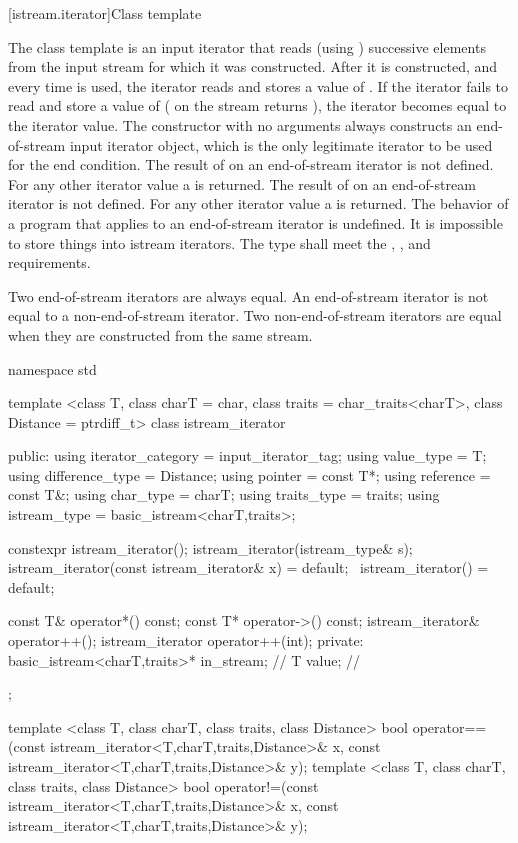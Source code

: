[istream.iterator]{Class template }

\pnum
{}%
The class template
is an input iterator that
reads (using
)
successive elements from the input stream for which it was constructed.
After it is constructed, and every time
\tcode{++}
is used, the iterator reads and stores a value of
.
If the iterator fails to read and store a value of 
(
on the stream returns
),
the iterator becomes equal to the
iterator value.
The constructor with no arguments
always constructs
an end-of-stream input iterator object, which is the only legitimate iterator to be used
for the end condition.
The result of
on an end-of-stream iterator is not defined.
For any other iterator value a
is returned.
The result of
on an end-of-stream iterator is not defined.
For any other iterator value a
is returned.
The behavior of a program that applies  to an end-of-stream
iterator is undefined.
It is impossible to store things into istream iterators.
The type  shall meet the ,
, and  requirements.

\pnum
Two end-of-stream iterators are always equal.
An end-of-stream iterator is not
equal to a non-end-of-stream iterator.
Two non-end-of-stream iterators are equal when they are constructed from the same stream.

\begin{codeblock}
namespace std {
  template <class T, class charT = char, class traits = char_traits<charT>,
      class Distance = ptrdiff_t>
  class istream_iterator {
  public:
    using iterator_category = input_iterator_tag;
    using value_type        = T;
    using difference_type   = Distance;
    using pointer           = const T*;
    using reference         = const T&;
    using char_type         = charT;
    using traits_type       = traits;
    using istream_type      = basic_istream<charT,traits>;

    constexpr istream_iterator();
    istream_iterator(istream_type& s);
    istream_iterator(const istream_iterator& x) = default;
    ~istream_iterator() = default;

    const T& operator*() const;
    const T* operator->() const;
    istream_iterator& operator++();
    istream_iterator  operator++(int);
  private:
    basic_istream<charT,traits>* in_stream; // \expos
    T value;                                // \expos
  };

  template <class T, class charT, class traits, class Distance>
    bool operator==(const istream_iterator<T,charT,traits,Distance>& x,
            const istream_iterator<T,charT,traits,Distance>& y);
  template <class T, class charT, class traits, class Distance>
    bool operator!=(const istream_iterator<T,charT,traits,Distance>& x,
            const istream_iterator<T,charT,traits,Distance>& y);
}
\end{codeblock}

